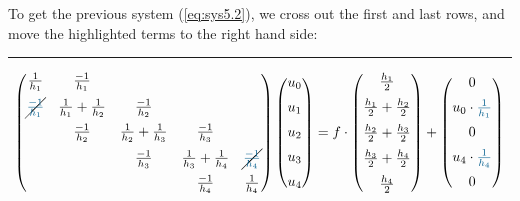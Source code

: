 \begin{example}
\newpage

To get the previous system (\ref{eq:sys5.2}), we cross out the first and last rows, and move the highlighted terms to the right hand side:

\begin{center}
    \rule{12.75cm}{0.4pt}
    \vspace{-1.3cm}
\end{center}

\[
\begin{pmatrix}
  \frac{1}{h_1}                 & \frac{-1}{h_1}                                                                                                                \\[0.2cm]
  \cancel{\tce{\frac{-1}{h_1}}} & \frac{1}{h_1} + \frac{1}{h_2} & \frac{-1}{h_2}                                                                                \\[0.2cm]
                                & \frac{-1}{h_2}                & \frac{1}{h_2} + \frac{1}{h_3} & \frac{-1}{h_3}                                                \\[0.2cm]
                                &                               & \frac{-1}{h_3}                & \frac{1}{h_3} + \frac{1}{h_4} & \cancel{\tce{\frac{-1}{h_4}}} \\[0.2cm]
                                &                               &                               & \frac{-1}{h_4}                & \frac{1}{h_4}
\end{pmatrix}
\begin{pmatrix}
  u_0 \\[0.2cm] u_1 \\[0.2cm] u_2 \\[0.2cm] u_3 \\[0.2cm] u_4
\end{pmatrix} = 
f\cdot
\begin{pmatrix}
  \frac{h_1}{2} \\[0.2cm] \frac{h_1}{2} + \frac{h_2}{2} \\[0.2cm] \frac{h_2}{2} + \frac{h_3}{2} \\[0.2cm] 
  \frac{h_3}{2} + \frac{h_4}{2} \\[0.2cm] \frac{h_4}{2}
\end{pmatrix} +
\begin{pmatrix}
  0 \\[0.2cm] u_0\cdot\tce{\frac{1}{h_1}} \\[0.2cm] 0 \\[0.2cm] u_4\cdot\tce{\frac{1}{h_4}} \\[0.2cm] 0
\end{pmatrix}
\]


\end{example}
